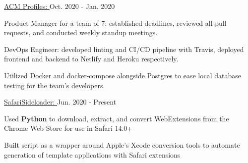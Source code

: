 
\begin{cventries}

  \cvproject
  {\href{https://elated-pike-6f8e56.netlify.app/}{ACM Profiles: }} %
  {Oct. 2020 - Jan. 2020} %
  {
    \begin{cvitems} %
      \item {Product Manager for a team of 7: established deadlines, reviewed all pull requests, and conducted weekly standup meetings.}
      \item {DevOps Engineer: developed linting and CI/CD pipeline with Travis, deployed frontend and backend to Netlify and Heroku respectively.}
      \item {Utilized Docker and docker-compose alongside Postgres to ease local database testing for the team's developers.}
    \end{cvitems}
  }

  \cvproject
    {\href{https://github.com/hexalellogram/SafariSideloader}{SafariSideloader: }} %
    {Jun. 2020 - Present} %
    {
      \begin{cvitems} %
        \item {Used \textbf{Python} to download, extract, and convert WebExtensions from the Chrome Web Store for use in Safari 14.0+}
        \item {Built script as a wrapper around Apple's Xcode conversion tools to automate generation of template applications with Safari extensions}
      \end{cvitems}
    }


\end{cventries}
